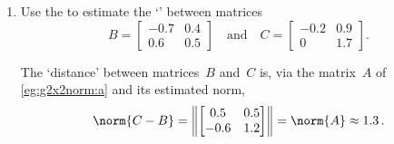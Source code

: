 \begin{example} \label{eg:}
\begin{enumerate}
\item Use the  to estimate the `' between matrices
\begin{equation*}
B=\begin{bmatrix} {-0.7}&{0.4}\\{0.6}&{0.5} \end{bmatrix}
\quad\text{and}\quad
C=\begin{bmatrix} -0.2&0.9\\0&1.7 \end{bmatrix}.
\end{equation*}
\begin{solution} 
The `distance' between matrices~\(B\) and~\(C\) is, via the matrix~\(A\) of \autoref{eg:g2x2norm:a} and its estimated norm,
\begin{equation*}
\norm{C-B}=\left\|\begin{bmatrix} 0.5&0.5\\-0.6&1.2 \end{bmatrix}\right\|
=\norm{A}\approx 1.3\,.
\end{equation*} 
\end{solution}



\end{enumerate}
\end{example}
